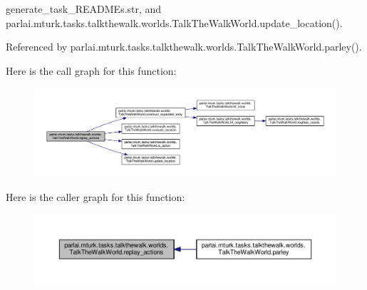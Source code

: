 generate\+\_\+task\+\_\+\+R\+E\+A\+D\+M\+Es.\+str, and parlai.\+mturk.\+tasks.\+talkthewalk.\+worlds.\+Talk\+The\+Walk\+World.\+update\+\_\+location().



Referenced by parlai.\+mturk.\+tasks.\+talkthewalk.\+worlds.\+Talk\+The\+Walk\+World.\+parley().

Here is the call graph for this function\+:
\nopagebreak
\begin{figure}[H]
\begin{center}
\leavevmode
\includegraphics[width=350pt]{classparlai_1_1mturk_1_1tasks_1_1talkthewalk_1_1worlds_1_1TalkTheWalkWorld_a2d73f3c22c536a60d65166b3ebd55e75_cgraph}
\end{center}
\end{figure}
Here is the caller graph for this function\+:
\nopagebreak
\begin{figure}[H]
\begin{center}
\leavevmode
\includegraphics[width=350pt]{classparlai_1_1mturk_1_1tasks_1_1talkthewalk_1_1worlds_1_1TalkTheWalkWorld_a2d73f3c22c536a60d65166b3ebd55e75_icgraph}
\end{center}
\end{figure}
\mbox{\label{classparlai_1_1mturk_1_1tasks_1_1talkthewalk_1_1worlds_1_1TalkTheWalkWorld_a0ef1913e867eaba5f24925ca3a8f1cda}} 
